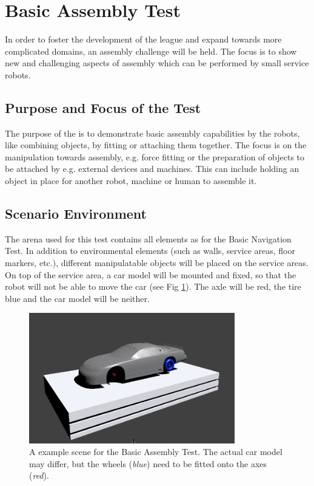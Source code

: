 \newpage
\section{Basic Assembly Test}
In order to foster the development of the league and expand towards more complicated domains, an assembly challenge will be held. The focus is to show new and challenging aspects of assembly which can be performed by small service robots.

\subsection{Purpose and Focus of the Test}
The purpose of the  is to demonstrate basic assembly capabilities by the robots, like combining objects, by fitting or attaching them together.
The focus is on the manipulation towards assembly, e.g. force fitting or the preparation of objects to be attached by e.g. external devices and machines. This can include holding an object in place for another robot, machine or human to assemble it.

\subsection{Scenario Environment}
The arena used for this test contains all elements as for the Basic Navigation Test. In addition to environmental elements (such as walls, service areas, floor markers, etc.), different manipulatable objects will be placed on the service areas. On top of the service area, a car model will be mounted and fixed, so that the robot will not be able to move the car (see Fig \ref{fig:BAT_car}). The axle will be red, the tire blue and the car model will be neither.

\begin{figure} [h!]
\centering
\includegraphics[width=0.8\textwidth ]{./images/BAT.png}
\caption{A example scene for the Basic Assembly Test. The actual car model may differ, but the wheels (\emph{blue}) need to be fitted onto the axes (\emph{red}).}
\label{fig:BAT_car}
\end{figure}


